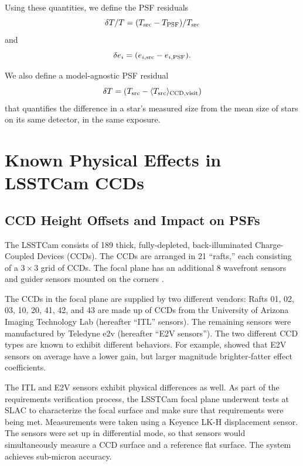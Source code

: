 \documentclass[SE,lsstdraft,authoryear,toc]{lsstdoc}
\begin{document}
Using these quantities, we define the PSF residuals
\begin{equation}
    \delta T/T = (T_{\rm src} - T_{\rm PSF})/T_{\rm src}
\end{equation}
and
\begin{equation}
    \delta e_i = (e_{i, \rm src} - e_{i, \rm PSF}) .
\end{equation}

We also define a model-agnostic PSF residual
\begin{equation}
    \delta T = (T_{\rm src} - \langle T_{\rm src}\rangle_{\rm CCD, visit})
\end{equation}
that quantifies the difference in a star's measured size from the mean size of stars on its same detector, in the same exposure. 


\section{Known Physical Effects in LSSTCam CCDs}\label{sec:known-effects}

\subsection{CCD Height Offsets and Impact on PSFs}

The LSSTCam consists of 189 thick, fully-depleted, back-illuminated Charge-Coupled Devices (CCDs). 
The CCDs are arranged in 21 ``rafts,'' each consisting of a $3\times3$ grid of CCDs. 
The focal plane has an additional 8 wavefront sensors and guider sensors mounted on the corners \citep{Document-16168}. 

The CCDs in the focal plane are supplied by two different vendors: Rafts 01, 02, 03, 10, 20, 41, 42, and 43 are made up of CCDs from thr University of Arizona Imaging Technology Lab (hereafter ``ITL'' sensors). 
The remaining sensors were manufactured by Teledyne e2v (hereafter ``E2V sensors'').
The two different CCD types are known to exhibit different behaviors.
For example, \cite{RTN-095} showed that E2V sensors on average have a lower gain, but larger magnitude brighter-fatter effect coefficients.

The ITL and E2V sensors exhibit physical differences as well. 
As part of the requirements verification process, the LSSTCam focal plane underwent tests at SLAC to characterize the focal surface and make sure that requirements were being met.
Measurements were taken using a Keyence LK-H displacement sensor. 
The sensors were set up in differential mode, so that sensors would simultaneously measure a CCD surface and a reference flat surface.
The system achieves sub-micron accuracy.
\end{document}
